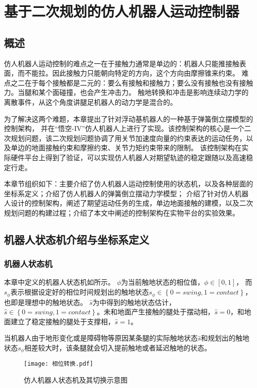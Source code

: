 \chapter{基于二次规划的仿人机器人运动控制器}
\section{概述}
仿人机器人运动控制的难点之一在于接触力通常是单边的：机器人只能推接触表面，而不能拉。因此接触力只能朝向特定的方向，这个方向由摩擦锥来约束。
难点之二在于每个接触都是二元的：要么有接触和接触力；要么没有接触也没有接触力。当腿和某个面碰撞，也会产生冲击力。
触地转换和冲击是影响连续动力学的离散事件，从这个角度讲腿足机器人的动力学是混合的。

为了解决这两个难题，本章提出了针对浮动基机器人的一种基于弹簧倒立摆模型的控制架构，
并在“悟空-IV”仿人机器人上进行了实现。该控制架构的核心是一个二次规划问题，该二次规划问题协调了用关节加速度向量的约束表达的运动任务，以及单边的地面接触约束和摩擦约束、关节力矩约束带来的限制。
该控制架构在实际硬件平台上得到了验证，可以实现仿人机器人对期望轨迹的稳定跟随以及高速稳定行走。

本章节组织如下：主要介绍了仿人机器人运动控制使用的状态机，以及各种层面的坐标系定义；介绍了仿人机器人的弹簧倒立摆动力学模型；
介绍了针对仿人机器人设计的控制架构，阐述了期望运动任务的生成，单边地面接触的建模，以及二次规划问题的构建过程；介绍了本文中阐述的控制架构在实物平台的实验效果。
\section{机器人状态机介绍与坐标系定义}
\label{sec:state_machine}
\subsection{机器人状态机}
本章中定义的机器人状态机如所示。
$\phi$为当前触地状态的相位值，$\phi \in \left[0, 1\right]$，
而$s_{\phi}$表示根据设定好的相位时间规划出的触地状态$s_{\phi} \in \left\{0=swing, 1=contact\right\}$，
也即是理想中的触地状态。
$\hat s$为中得到的触地状态估计，$\hat s \in \left\{0=swing, 1=contact\right\}$。未和地面产生接触的腿处于摆动相，$\hat s = 0$，和地面建立了稳定接触的腿处于支撑相，$\hat s = 1$。

当机器人由于地形变化或是障碍物等原因某条腿的实际触地状态$\hat s$和规划出的触地状态$s_{\phi}$相差较大时，该条腿就会切入提前触地或者延迟触地的状态。
\begin{figure}[htbp]
    \centering
    \texttt{[image: 相位转换.pdf]}
    \caption{\label{fig:state_machine}仿人机器人状态机及其切换示意图}
\end{figure}
